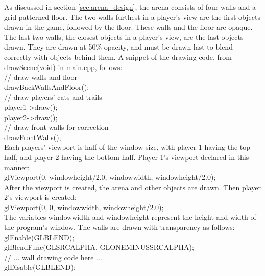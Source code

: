 \documentclass[12pt]{article}
\begin{document}
As discussed in section \ref{sec:arena_design}, the arena consists of four walls and a grid patterned floor.  The two walls furthest in a player's view are the first objects drawn in the game, followed by the floor.  These walls and the floor are opaque.  The last two walls, the closest objects in a player's view, are the last objects drawn.  They are drawn at 50\% opacity, and must be drawn last to blend correctly with objects behind them.  A snippet of the drawing code, from drawScene(void) in main.cpp, follows:\\

\indent // draw walls and floor \\
\indent drawBackWallsAndFloor(); \\
\indent // draw players' cats and trails\\
\indent player1-\textgreater draw();\\
\indent player2-\textgreater draw();\\
\indent // draw front walls for correction\\
\indent drawFrontWalls();\\

Each players' viewport is half of the window size, with player 1 having the top half, and player 2 having the bottom half.  Player 1's viewport declared in this manner:\\

glViewport(0, window\textunderscore height/2.0, window\textunderscore width, window\textunderscore height/2.0);\\

After the viewport is created, the arena and other objects are drawn.  Then player 2's viewport is created:\\

glViewport(0, 0, window\textunderscore width, window\textunderscore height/2.0);\\

The variables window\textunderscore width and window\textunderscore height represent the height and width of the program's window.  The walls are drawn with transparency as follows: \\

\indent glEnable(GL\textunderscore BLEND);\\
\indent glBlendFunc(GL\textunderscore SRC\textunderscore ALPHA, GL\textunderscore ONE\textunderscore MINUS\textunderscore SRC\textunderscore ALPHA);\\
\indent // ... wall drawing code here ... \\
\indent glDisable(GL\textunderscore BLEND);\\
\end{document}
